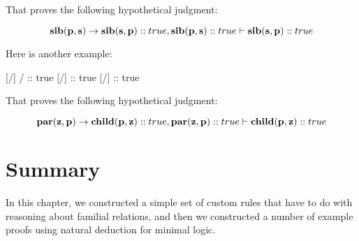 \documentclass[../../../main.tex]{subfiles}
\begin{document}
\noindent
That proves the following hypothetical judgment:

\begin{equation*}
  \nd{sib(p, s)} \impl/ \nd{sib(s, p)} :: true, \nd{sib(p, s)} :: true \ndturnstile/ \nd{sib(s, p)} :: true
\end{equation*}

\noindent
Here is another example:

\begin{prooftree*}
  \hypo{}
  [\startrule/]{ \impl/  :: true}
  \hypo{}
  [\startrule/]{ :: true}
  [\implElim/]{ :: true}
\end{prooftree*}

\noindent
That proves the following hypothetical judgment:

\begin{equation*}
  \nd{par(z, p)} \impl/ \nd{child(p, z)} :: true, \nd{par(z, p)} :: true \ndturnstile/ \nd{child(p, z)} :: true
\end{equation*}

 
\section{Summary}

In this chapter, we constructed a simple set of custom rules that have to do with reasoning about familial relations, and then we constructed a number of example proofs using natural deduction for minimal logic.
\end{document}
